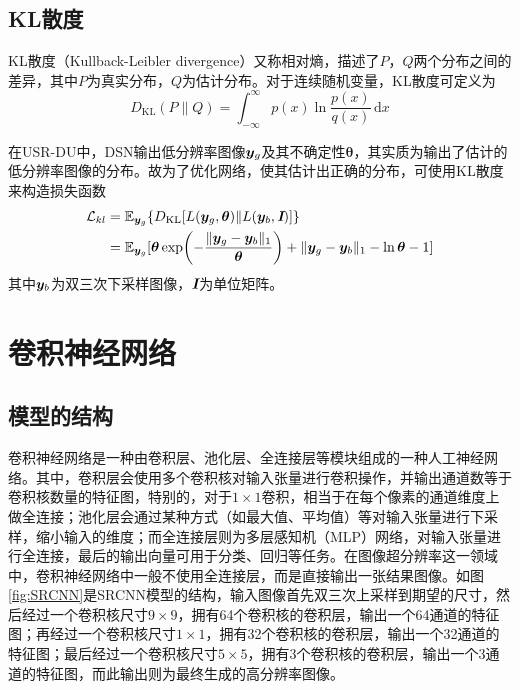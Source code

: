 \subsection{KL散度}
KL散度（Kullback-Leibler divergence）又称相对熵，描述了$P$，$Q$两个分布之间的差异，其中$P$为真实分布，$Q$为估计分布。对于连续随机变量，KL散度可定义为
\begin{equation}
    D_{\text{KL}}(P\|Q)=\int^\infty_{-\infty}p(x)\ln\frac{p(x)}{q(x)}\,\text{d}x
\end{equation}

在USR-DU中，DSN输出低分辨率图像$\vb*{y}_g$及其不确定性$\bm{\theta}$，其实质为输出了估计的低分辨率图像的分布。故为了优化网络，使其估计出正确的分布，可使用KL散度来构造损失函数
\begin{equation}
    \begin{aligned}
        \mathcal{L}_{kl}&=\mathbb{E}_{\vb*{y}_g}\{D_{\text{KL}}[L(\vb*{y}_g,\bm{\theta})\|L(\vb*{y}_b,\textbf{\em I})]\}  \\
        &=\mathbb{E}_{\vb*{y}_g}[\bm{\theta}\exp(-\frac{\|\vb*{y}_g-\vb*{y}_b\|_1}{\bm{\theta}})+\|\vb*{y}_g-\vb*{y}_b\|_1-\ln\bm{\theta}-1]
    \end{aligned}
    \label{equ:kl}
\end{equation}
其中$\vb*{y}_b$为双三次下采样图像，$\textbf{\em I}$为单位矩阵。

\section{卷积神经网络}
\subsection{模型的结构}
卷积神经网络是一种由卷积层、池化层、全连接层等模块组成的一种人工神经网络。其中，卷积层会使用多个卷积核对输入张量进行卷积操作，并输出通道数等于卷积核数量的特征图，特别的，对于$1\times 1$卷积，相当于在每个像素的通道维度上做全连接；池化层会通过某种方式（如最大值、平均值）等对输入张量进行下采样，缩小输入的维度；而全连接层则为多层感知机（MLP）网络，对输入张量进行全连接，最后的输出向量可用于分类、回归等任务。在图像超分辨率这一领域中，卷积神经网络中一般不使用全连接层，而是直接输出一张结果图像。如图\ref{fig:SRCNN}是SRCNN模型的结构，输入图像首先双三次上采样到期望的尺寸，然后经过一个卷积核尺寸$9\times 9$，拥有64个卷积核的卷积层，输出一个64通道的特征图；再经过一个卷积核尺寸$1\times 1$，拥有32个卷积核的卷积层，输出一个32通道的特征图；最后经过一个卷积核尺寸$5\times 5$，拥有3个卷积核的卷积层，输出一个3通道的特征图，而此输出则为最终生成的高分辨率图像。
